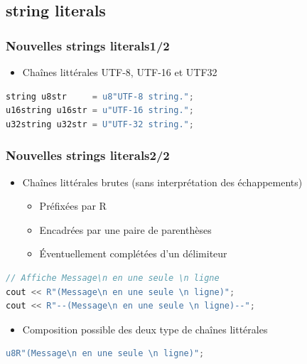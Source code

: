 \documentclass[C++.tex]{subfiles}
\begin{document}
\subsection*{string literals}
\begin{frame}[fragile]
	\frametitle{Nouvelles strings literals\titlehfill{}1/2}
	\begin{itemize}
		\item Chaînes littérales UTF-8, UTF-16 et UTF32
	\end{itemize}

	\begin{lstlisting}[language=C++]
string u8str     = u8"UTF-8 string.";
u16string u16str = u"UTF-16 string.";
u32string u32str = U"UTF-32 string.";\end{lstlisting}
\end{frame}

\begin{frame}[fragile]
	\frametitle{Nouvelles strings literals\titlehfill{}2/2}
	\begin{itemize}
		\item Chaînes littérales brutes (sans interprétation des échappements)


		\begin{itemize}
			\item Préfixées par R
			\item Encadrées par une paire de parenthèses
			\item Éventuellement complétées d'un délimiteur
		\end{itemize}
	\end{itemize}

	\begin{lstlisting}[language=C++]
// Affiche Message\n en une seule \n ligne
cout << R"(Message\n en une seule \n ligne)";
cout << R"--(Message\n en une seule \n ligne)--";\end{lstlisting}

	\begin{itemize}
		\item Composition possible des deux type de chaînes littérales
	\end{itemize}

	\begin{lstlisting}[language=C++]
u8R"(Message\n en une seule \n ligne)";\end{lstlisting}
\end{frame}
\end{document}
